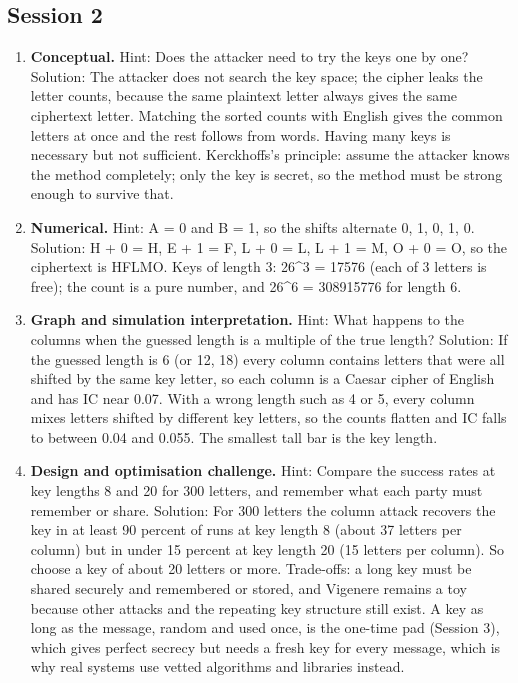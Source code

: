 \documentclass[11pt,a4paper]{article}
\begin{document}
\subsection*{Session 2}
\begin{enumerate}[nosep]
\item \textbf{Conceptual.} Hint: Does the attacker need to try the keys one by one? Solution: The attacker does not search the key space; the cipher leaks the letter counts, because the same plaintext letter always gives the same ciphertext letter. Matching the sorted counts with English gives the common letters at once and the rest follows from words. Having many keys is necessary but not sufficient. Kerckhoffs's principle: assume the attacker knows the method completely; only the key is secret, so the method must be strong enough to survive that.
\item \textbf{Numerical.} Hint: A = 0 and B = 1, so the shifts alternate 0, 1, 0, 1, 0. Solution: H + 0 = H, E + 1 = F, L + 0 = L, L + 1 = M, O + 0 = O, so the ciphertext is HFLMO. Keys of length 3: 26\textasciicircum{}3 = 17576 (each of 3 letters is free); the count is a pure number, and 26\textasciicircum{}6 = 308915776 for length 6.
\item \textbf{Graph and simulation interpretation.} Hint: What happens to the columns when the guessed length is a multiple of the true length? Solution: If the guessed length is 6 (or 12, 18) every column contains letters that were all shifted by the same key letter, so each column is a Caesar cipher of English and has IC near 0.07. With a wrong length such as 4 or 5, every column mixes letters shifted by different key letters, so the counts flatten and IC falls to between 0.04 and 0.055. The smallest tall bar is the key length.
\item \textbf{Design and optimisation challenge.} Hint: Compare the success rates at key lengths 8 and 20 for 300 letters, and remember what each party must remember or share. Solution: For 300 letters the column attack recovers the key in at least 90 percent of runs at key length 8 (about 37 letters per column) but in under 15 percent at key length 20 (15 letters per column). So choose a key of about 20 letters or more. Trade-offs: a long key must be shared securely and remembered or stored, and Vigenere remains a toy because other attacks and the repeating key structure still exist. A key as long as the message, random and used once, is the one-time pad (Session 3), which gives perfect secrecy but needs a fresh key for every message, which is why real systems use vetted algorithms and libraries instead.
\end{enumerate}
\end{document}
